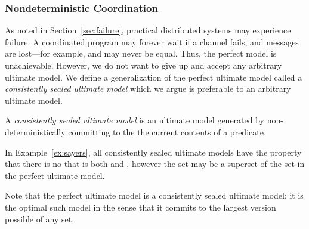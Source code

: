 
\subsubsection{Nondeterministic Coordination}
As noted in Section~\ref{sec:failure}, practical distributed systems may experience failure.  A coordinated program may forever wait if a channel fails, and messages are lost---for example,  and  may never be equal.  Thus, the perfect model is unachievable.  However, we do not want to give up and accept any arbitrary ultimate model.  We define a generalization of the perfect ultimate model called a {\em consistently sealed ultimate model} which we argue is preferable to an arbitrary ultimate model.

\begin{definition}
A {\em consistently sealed ultimate model} is an ultimate model generated by non-deterministically committing to the the current contents of a predicate.
\end{definition}

In Example~\ref{ex:sayers}, all consistently sealed ultimate models have the property that there is no  that is both  and , however the  set may be a superset of the  set in the perfect ultimate model.  

Note that the perfect ultimate model is a consistently sealed ultimate model; it is the optimal such model in the sense that it commits to the largest version possible of any set.



